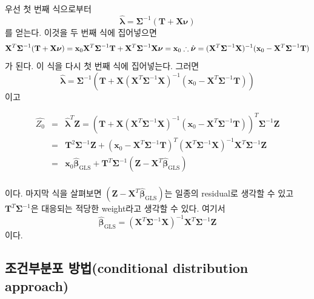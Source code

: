 \documentclass[b5paper,]{scrbook}
\theoremstyle{plain}
\theoremstyle{definition}
\numberwithin{equation}{section}
\begin{document}
우선 첫 번째 식으로부터
\[\hat{\boldsymbol{\lambda}}=\boldsymbol{\Sigma}^{-1}(\mathbf{T}+\mathbf{X}\boldsymbol{\nu})\]
를 얻는다. 이것을 두 번째 식에 집어넣으면
\[
\mathbf{X}^{T}\boldsymbol{\Sigma}^{-1}(\mathbf{T}+\mathbf{X}\boldsymbol{\nu})=\mathbf{x}_{0}\\
\mathbf{X}^{T}\boldsymbol{\Sigma}^{-1}\mathbf{T}+\mathbf{X}^{T}\boldsymbol{\Sigma}^{-1}\mathbf{X}\boldsymbol{\nu}=\mathbf{x}_{0}\\
\therefore \hat{\boldsymbol{\nu}}=(\mathbf{X}^{T}\boldsymbol{\Sigma}^{-1}\mathbf{X})^{-1}(\mathbf{x}_{0}-\mathbf{X}^{T}\boldsymbol{\Sigma}^{-1}\mathbf{T})\\
\]
가 된다. 이 식을 다시 첫 번째 식에 집어넣는다. 그러면
\[\hat{\boldsymbol{\lambda}}=\boldsymbol{\Sigma}^{-1}(\mathbf{T}+\mathbf{X}(\mathbf{X}^{T}\boldsymbol{\Sigma}^{-1}\mathbf{X})^{-1}(\mathbf{x}_{0}-\mathbf{X}^{T}\boldsymbol{\Sigma}^{-1}\mathbf{T}))\]
이고

\begin{eqnarray*}
\hat{Z_{0}}&=&\hat{\boldsymbol{\lambda}}^{T}\mathbf{Z}=(\mathbf{T}+\mathbf{X}(\mathbf{X}^{T}\boldsymbol{\Sigma}^{-1}\mathbf{X})^{-1}(\mathbf{x}_{0}-\mathbf{X}^{T}\boldsymbol{\Sigma}^{-1}\mathbf{T}))^{T}\boldsymbol{\Sigma}^{-1}\mathbf{Z}\\
&=&\mathbf{T}^{2}\boldsymbol{\Sigma}^{-1}\mathbf{Z}+(\mathbf{x}_{0}-\mathbf{X}^{T}\boldsymbol{\Sigma}^{-1}\mathbf{T})^{T}(\mathbf{X}^{T}\boldsymbol{\Sigma}^{-1}\mathbf{X})^{-1}\mathbf{X}^{T}\boldsymbol{\Sigma}^{-1}\mathbf{Z}\\
&=&\mathbf{x}_{0}\hat{\boldsymbol{\beta}}_{\text{GLS}}+\mathbf{T}^{T}\boldsymbol{\Sigma}^{-1}(\mathbf{Z}-\mathbf{X}^{T}\hat{\boldsymbol{\beta}}_{\text{GLS}})\\
\end{eqnarray*}

이다. 마지막 식을 살펴보면 \((\mathbf{Z}-\mathbf{X}^{T}\hat{\boldsymbol{\beta}}_{\text{GLS}})\)는 일종의 residual로 생각할 수 있고 \(\mathbf{T}^{T}\boldsymbol{\Sigma}^{-1}\)은 대응되는 적당한 weight라고 생각할 수 있다. 여기서
\[\hat{\boldsymbol{\beta}}_{\text{GLS}}=(\mathbf{X}^{T}\boldsymbol{\Sigma}^{-1}\mathbf{X})^{-1}\mathbf{X}^{T}\boldsymbol{\Sigma}^{-1}\mathbf{Z}\]
이다.

\hypertarget{-conditional-distribution-approach}{%
\subsection{조건부분포 방법(conditional distribution approach)}\label{-conditional-distribution-approach}}
\end{document}
